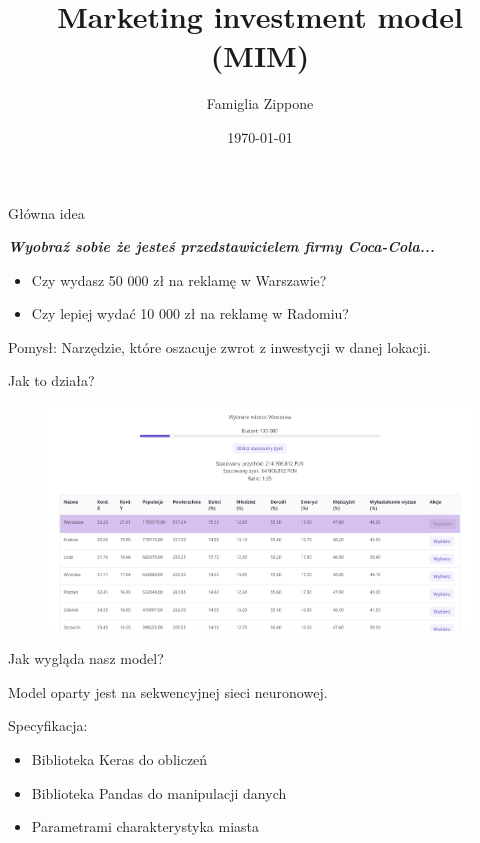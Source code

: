 \documentclass{beamer}
\title{Marketing investment model (MIM)}
\author{Famiglia Zippone}
\institute{UWr}
\date{\today}
\begin{document}
\begin{frame}
\titlepage
\end{frame}


\begin{frame}{Główna idea}

{\center\it\bf
Wyobraź sobie że jesteś przedstawicielem firmy Coca-Cola...
}
\vspace{0.5cm}

\pause

\begin{itemize}
    \item Czy wydasz 50 000 zł na reklamę w Warszawie?
    \item Czy lepiej wydać 10 000 zł na reklamę w Radomiu?
\end{itemize}
\vspace{0.5cm}

\pause

{\color{red} Pomysł:} Narzędzie, które oszacuje zwrot z inwestycji w danej lokacji.  

\end{frame}


\begin{frame}{Jak to działa?}
\begin{figure}
    \centering
    \includegraphics[width=\linewidth]{site_demo.png}
\end{figure}
\end{frame}



\begin{frame}[t]{Jak wygląda nasz model?}

{\Large Model oparty jest na sekwencyjnej sieci neuronowej.

\vspace{0.5cm}

Specyfikacja:}

\vspace{1cm}
\begin{itemize}
    \setlength\itemsep{1em}
    \item Biblioteka Keras do obliczeń
    \item Biblioteka Pandas do manipulacji danych
    \item Parametrami charakterystyka miasta
\end{itemize}
\end{frame}
\end{document}
